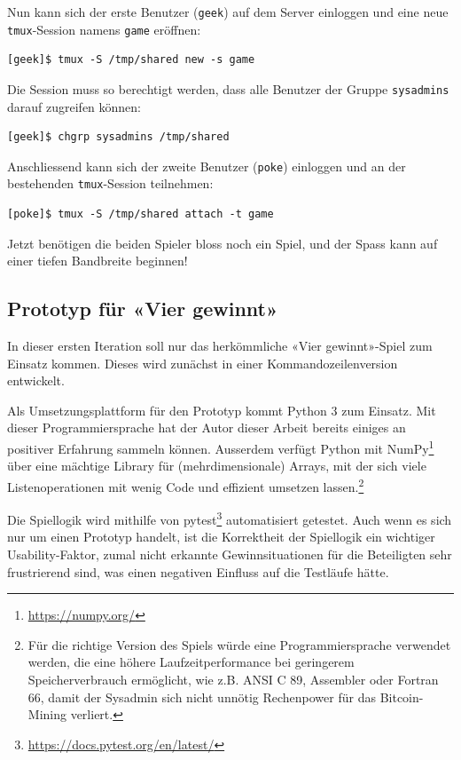 \documentclass[a4paper,11pt,hidelinks]{scrartcl}
\begin{document}
Nun kann sich der erste Benutzer (\texttt{geek}) auf dem Server einloggen und eine neue \texttt{tmux}-Session namens \texttt{game} eröffnen:

\begin{lstlisting}
[geek]$ tmux -S /tmp/shared new -s game
\end{lstlisting}

Die Session muss so berechtigt werden, dass alle Benutzer der Gruppe \texttt{sysadmins} darauf zugreifen können:

\begin{lstlisting}
[geek]$ chgrp sysadmins /tmp/shared
\end{lstlisting}

Anschliessend kann sich der zweite Benutzer (\texttt{poke}) einloggen und an der bestehenden \texttt{tmux}-Session teilnehmen:

\begin{lstlisting}
[poke]$ tmux -S /tmp/shared attach -t game
\end{lstlisting}

Jetzt benötigen die beiden Spieler bloss noch ein Spiel, und der Spass kann auf einer tiefen Bandbreite beginnen!

\subsection{Prototyp für «Vier gewinnt»}

In dieser ersten Iteration soll nur das herkömmliche «Vier gewinnt»-Spiel zum Einsatz kommen. Dieses wird zunächst in einer Kommandozeilenversion entwickelt.

Als Umsetzungsplattform für den Prototyp kommt Python 3 zum Einsatz. Mit dieser Programmiersprache hat der Autor dieser Arbeit bereits einiges an positiver Erfahrung sammeln können. Ausserdem verfügt Python mit NumPy\footnote{\url{https://numpy.org/}} über eine mächtige Library für (mehrdimensionale) Arrays, mit der sich viele Listenoperationen mit wenig Code und effizient umsetzen lassen.\footnote{Für die richtige Version des Spiels würde eine Programmiersprache verwendet werden, die eine höhere Laufzeitperformance bei geringerem Speicherverbrauch ermöglicht, wie z.B. ANSI C 89, Assembler oder Fortran 66, damit der Sysadmin sich nicht unnötig Rechenpower für das Bitcoin-Mining verliert.}

Die Spiellogik wird mithilfe von pytest\footnote{\url{https://docs.pytest.org/en/latest/}} automatisiert getestet. Auch wenn es sich nur um einen Prototyp handelt, ist die Korrektheit der Spiellogik ein wichtiger Usability-Faktor, zumal nicht erkannte Gewinnsituationen für die Beteiligten sehr frustrierend sind, was einen negativen Einfluss auf die Testläufe hätte.
\end{document}
